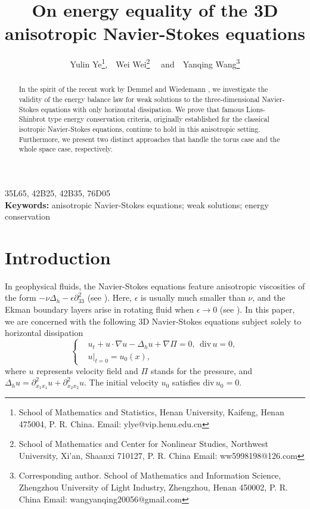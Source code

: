 \documentclass[11pt]{article}
\theoremstyle{plain}\newtheorem{definition}{Definition}[section]
\theoremstyle{definition}\newtheorem{theorem}{Theorem}[section]
\theoremstyle{plain}\newtheorem{lemma}[theorem]{Lemma}
\theoremstyle{plain}\newtheorem{coro}[theorem]{Corollary}
\theoremstyle{plain}\newtheorem{prop}[theorem]{Proposition}
\theoremstyle{remark}\newtheorem{remark}{Remark}[section]
\numberwithin{equation}{section}
\begin{document}
 \title{On energy equality   of the 3D anisotropic Navier-Stokes equations}
 \author{Yulin Ye\footnote{School of Mathematics and Statistics, Henan University, Kaifeng, Henan  475004, P. R. China. Email: ylye@vip.henu.edu.cn },\;~~Wei Wei\footnote{ School of Mathematics and Center for Nonlinear Studies,  Northwest University, Xi'an, Shaanxi 710127,  P. R. China  Email: ww5998198@126.com }
  \;~~and~~Yanqing Wang\footnote{Corresponding author. School of Mathematics and   Information Science, Zhengzhou University of Light Industry, Zhengzhou, Henan  450002,  P. R. China Email: wangyanqing20056@gmail.com}
   }
\date{}
\maketitle
\begin{abstract}
In the spirit of the recent work by Demmel and Wiedemann \cite{[DW]}, we investigate the validity of the energy balance law for weak solutions to the three-dimensional Navier-Stokes equations with only horizontal dissipation. We prove that famous  Lions-Shinbrot type energy conservation criteria, originally established for the classical isotropic Navier-Stokes equations, continue to hold in this anisotropic setting. Furthermore, we present two distinct approaches that handle  the torus case and the whole space case, respectively.


 \end{abstract}
\quad 35L65, 42B25, 42B35, 76D05 \\\noindent
 {\bf Keywords:}  anisotropic Navier-Stokes equations; weak solutions; energy conservation \\
\section{Introduction}
\label{intro}
\setcounter{section}{1}\setcounter{equation}{0}
 In geophysical fluids, the Navier-Stokes equations feature anisotropic viscosities of the form  $-\nu\Delta_{h}-\epsilon\partial^{2}_{33}$ (see \cite{[Pedlosky]}). Here, $\epsilon$ is usually much smaller than $\nu$, and the  Ekman boundary layers    arise  in rotating fluid when $\epsilon\rightarrow0$ (see \cite{[Pedlosky]}).
In this paper, we are concerned with the following 3D Navier-Stokes equations subject solely to horizontal dissipation
 \begin{equation}\left\{\begin{aligned}\label{anNS}
&u_{t}+u\cdot \nabla u-\Delta_{h}u+\nabla \Pi=0,~~\text{div}\, u=0,\\
&u|_{t=0}=u_{0}(x),
\end{aligned}\right.\end{equation}
where $u$ represents velocity field and $\Pi$ stands for the pressure, and $\Delta_h u=\partial^{2}_{x_1x_1} u+\partial^{2}_{x_2x_2} u$.
 The
initial  velocity $u_0$ satisfies   $\text{div}\,u_0=0$.
\end{document}
